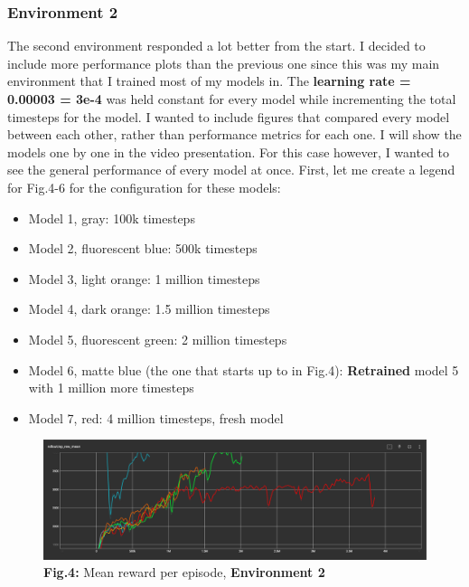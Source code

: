 \documentclass{article}
\numberwithin{equation}{section}
\numberwithin{equation}{section}
\begin{document}
\subsubsection*{Environment 2}
The second environment responded a lot better from the start. I decided to include more performance plots than the previous one since this was my main environment that I trained most of my models in. The \textbf{learning rate = 0.00003 = 3e-4} was held constant for every model while incrementing the total timesteps for the model. I wanted to include figures that compared every model between each other, rather than performance metrics for each one. I will show the models one by one in the video presentation. For this case however, I wanted to see the general performance of every model at once. First, let me create a legend for Fig.4-6 for the configuration for these models:

\begin{itemize}
\item Model 1, gray: 100k timesteps
\item Model 2, fluorescent blue: 500k timesteps
\item Model 3, light orange: 1 million timesteps
\item Model 4, dark orange: 1.5 million timesteps
\item Model 5, fluorescent green: 2 million timesteps
\item Model 6, matte blue (the one that starts up to in Fig.4): \textbf{Retrained} model 5 with 1 million more timesteps
\item Model 7, red: 4 million timesteps, fresh model

\end{itemize}




\begin{figure}[H]
	\centering
\includegraphics[scale=3,width=\linewidth]{ep_rew_mean_env2.png}
	\\	
	\vspace{0.1in}
	\textbf{Fig.4:} Mean reward per episode, \textbf{Environment 2}
	\\
	\label{fig:Fig.3}
\end{figure}
\end{document}
